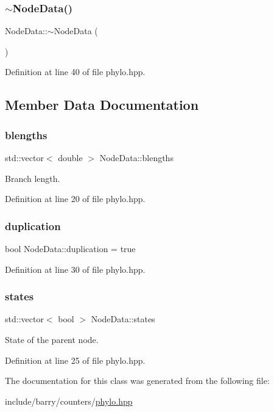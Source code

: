 \subsubsection{\texorpdfstring{$\sim$\+Node\+Data()}{~NodeData()}}
{\footnotesize\ttfamily Node\+Data\+::$\sim$\+Node\+Data (\begin{DoxyParamCaption}{ }\end{DoxyParamCaption})\hspace{0.3cm}{\ttfamily [inline]}}



Definition at line 40 of file phylo.\+hpp.



\subsection{Member Data Documentation}
\mbox{\label{class_node_data_a02da5f097c105813216d87ef89ad7bd4}} 
\subsubsection{\texorpdfstring{blengths}{blengths}}
{\footnotesize\ttfamily std\+::vector$<$ double $>$ Node\+Data\+::blengths}

Branch length. 

Definition at line 20 of file phylo.\+hpp.

\mbox{\label{class_node_data_a6c21d52091bb4fa6e3d431856da17caa}} 
\subsubsection{\texorpdfstring{duplication}{duplication}}
{\footnotesize\ttfamily bool Node\+Data\+::duplication = true}



Definition at line 30 of file phylo.\+hpp.

\mbox{\label{class_node_data_a33caaadde6afe892624501bdb0edaea6}} 
\subsubsection{\texorpdfstring{states}{states}}
{\footnotesize\ttfamily std\+::vector$<$ bool $>$ Node\+Data\+::states}

State of the parent node. 

Definition at line 25 of file phylo.\+hpp.



The documentation for this class was generated from the following file\+:\begin{DoxyCompactItemize}
\item 
include/barry/counters/\hyperlink{phylo_8hpp}{phylo.\+hpp}\end{DoxyCompactItemize}
